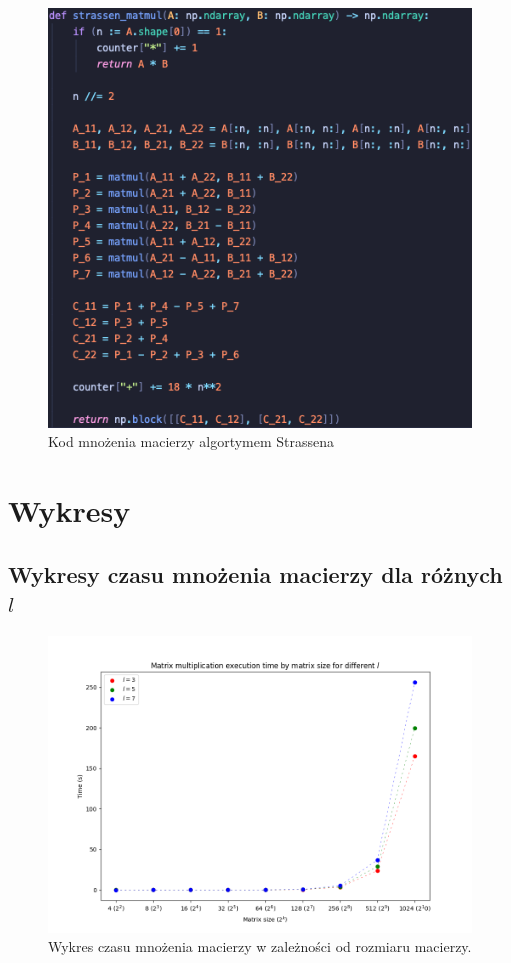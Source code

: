 \documentclass{article}
\begin{document}
\begin{figure}[h]
  \centering
  \includegraphics[scale=0.59]{strassen_matmul.png}
  \caption{Kod mnożenia macierzy algortymem Strassena}
\end{figure}

\section{Wykresy}

\subsection{Wykresy czasu mnożenia macierzy dla różnych $l$}

\begin{figure}[h]
  \centering
  \includegraphics[scale=0.35]{linear_time_scatter_plot.png}
  \caption{Wykres czasu mnożenia macierzy w zależności od rozmiaru macierzy.}
\end{figure}
\end{document}
